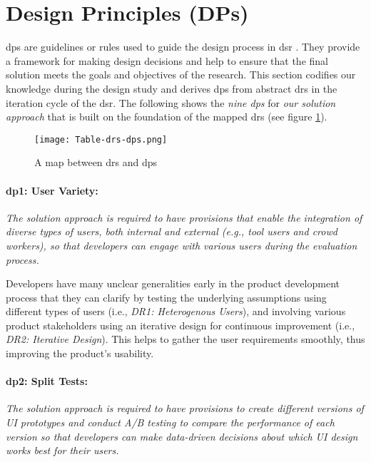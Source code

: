 \clearpage
\section{Design Principles (DPs)}
\label{design:section:designprinciple}
\ac{dp}s are guidelines or rules used to guide the design process in \ac{dsr} \cite{misc:dsr:henver}. 
They provide a framework for making design decisions \cite{paper:designprinciple:gregor} and help to ensure that the final solution meets the goals and objectives of the research. 
This section codifies our knowledge during the design study and derives \ac{dp}s from abstract \ac{dr}s in the iteration cycle of the \ac{dsr}.
The following shows the \textit{nine \ac{dp}s} for \textit{our solution approach} that is built on the foundation of the mapped \ac{dr}s (see figure \ref{fig:design:table-drs-dps}). 
\begin{figure}[htbp!]
  \centering    
  \texttt{[image: Table-drs-dps.png]}
  \caption[A map between \ac{dr}s and \ac{dp}s]{A map between \ac{dr}s and \ac{dp}s}
  \label{fig:design:table-drs-dps}
\end{figure}

\paragraph{\ac{dp}1: User Variety:} \textit{The solution approach is required to have provisions that enable the integration of diverse types of users, both internal and external (e.g., tool users and crowd workers), so that developers can engage with various users during the evaluation process.}

Developers have many unclear generalities early in the product development process \cite{misc:lean:steve} that they can clarify by testing the underlying assumptions using different types of users (i.e., \textit{DR1: Heterogenous Users}), and involving various product stakeholders using an iterative design for continuous improvement (i.e., \textit{DR2: Iterative Design}).
This helps to gather the user requirements smoothly, thus improving the product's usability.

\paragraph{\ac{dp}2: Split Tests:} \textit{The solution approach is required to have provisions to create different versions of UI prototypes and conduct A/B testing to compare the performance of each version so that developers can make data-driven decisions about which UI design works best for their users.}


